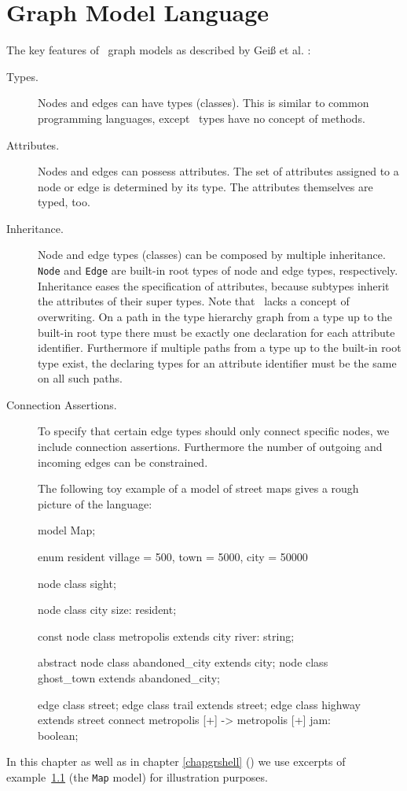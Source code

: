 \chapter{Graph Model Language}
\label{chapmodellang}
The key features of \GrG\ graph models as described by Geiß et al. \cite{geiss}:

\begin{description}
\item[Types.] Nodes and edges can have types (classes). This is similar to common programming languages, except \GrG\ types have no concept of methods. 
\item[Attributes.] Nodes and edges can possess attributes. The set of attributes assigned to a node or edge is determined by its type. The attributes themselves are typed, too.
\item[Inheritance.] Node and edge types (classes) can be composed by multiple inheritance. \texttt{Node} and \texttt{Edge} are built-in root types of node and edge types, respectively. Inheritance eases the specification of attributes, because subtypes inherit the attributes of their super types. Note that \GrG\ lacks a concept of overwriting. On a path in the type hierarchy graph from a type up to the built-in root type there must be exactly one declaration for each attribute identifier. Furthermore if multiple paths from a type up to the built-in root type exist, the declaring types for an attribute identifier must be the same on all such paths.
\item[Connection Assertions.] To specify that certain edge types should only connect specific nodes, we include connection assertions. Furthermore the number of outgoing and incoming edges can be constrained.
\end{description}

\begin{figure}[htbf]
\begin{example}\label{ex:model:map}
The following toy example of a model of street maps gives a rough picture of the language:
\begin{grgen}
model Map;

enum resident {village = 500, town = 5000, city = 50000}

node class sight;

node class city {
	size: resident;
}

const node class metropolis extends city {
  river: string;
}  

abstract node class abandoned_city extends city;
node class ghost_town extends abandoned_city;

edge class street;
edge class trail extends street;
edge class highway extends street
    connect metropolis [+] -> metropolis [+]
{
    jam: boolean;
}
\end{grgen}
\end{example}
\end{figure}
In this chapter as well as in chapter \ref{chapgrshell} (\GrShell) we use excerpts of example~\ref{ex:model:map} (the \texttt{Map} model) for illustration purposes.
